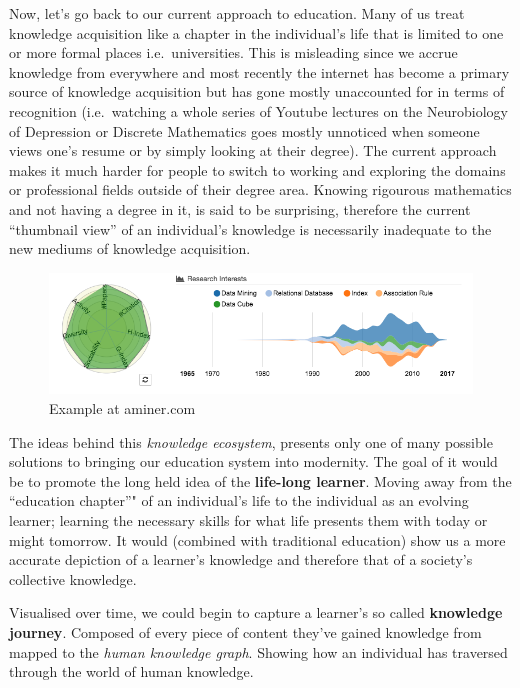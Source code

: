 \documentclass{acm_proc_article-sp}
\begin{document}
Now, let's go back to our current approach to education. Many of us
treat knowledge acquisition like a chapter in the individual's life that
is limited to one or more formal places i.e.~universities. This is
misleading since we accrue knowledge from everywhere and most recently
the internet has become a primary source of knowledge acquisition but
has gone mostly unaccounted for in terms of recognition (i.e.~watching a
whole series of Youtube lectures on the Neurobiology of Depression or
Discrete Mathematics goes mostly unnoticed when someone views one's
resume or by simply looking at their degree). The current approach makes
it much harder for people to switch to working and exploring the domains
or professional fields outside of their degree area. Knowing rigourous
mathematics and not having a degree in it, is said to be surprising,
therefore the current ``thumbnail view'' of an individual's knowledge is
necessarily inadequate to the new mediums of knowledge acquisition.

\begin{figure}
\centering
\includegraphics{img/aminer.png}
\caption{Example at aminer.com}
\end{figure}

The ideas behind this \emph{knowledge ecosystem}, presents only one of
many possible solutions to bringing our education system into modernity.
The goal of it would be to promote the long held idea of the
\textbf{life-long learner}. Moving away from the ``education chapter''"
of an individual's life to the individual as an evolving learner;
learning the necessary skills for what life presents them with today or
might tomorrow. It would (combined with traditional education) show us a
more accurate depiction of a learner's knowledge and therefore that of a
society's collective knowledge.

Visualised over time, we could begin to capture a learner's so called
\textbf{knowledge journey}. Composed of every piece of content they've
gained knowledge from mapped to the \emph{human knowledge graph}.
Showing how an individual has traversed through the world of human
knowledge.
\end{document}
